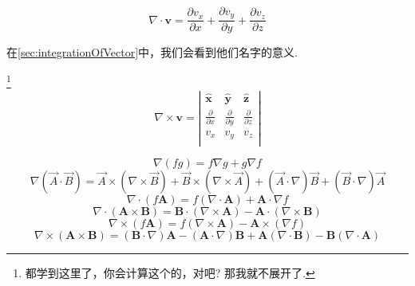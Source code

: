 \begin{theorem}[散度]
    \begin{equation}
        \nabla \cdot \mathbf{v}=\frac{\partial v_x}{\partial x}+\frac{\partial v_y}{\partial y}+\frac{\partial v_z}{\partial z}
    \end{equation}
\end{theorem}

在\cref{sec:integrationOfVector}中，我们会看到他们名字的意义.

\begin{theorem}[旋度]\footnote{都学到这里了，你会计算这个的，对吧? 那我就不展开了.}
    \begin{equation}
        \nabla \times \mathbf{v}=\left| \begin{matrix}
            \hat{\mathbf{x}}&		\hat{\mathbf{y}}&		\hat{\mathbf{z}}\\
            \frac{\partial}{\partial x}&		\frac{\partial}{\partial y}&		\frac{\partial}{\partial z}\\
            v_x&		v_y&		v_z\\
        \end{matrix} \right|
    \end{equation}
\end{theorem}

\begin{theorem}[微分的积规则]
    \begin{equation}
        \nabla(fg) = f\nabla g+g\nabla f \label{eq:diff_rule1}
    \end{equation}
    \begin{equation}
        \nabla(\vec A \cdot \vec B) = \vec A \times (\nabla \times \vec B) + \vec B \times (\nabla \times \vec A) + (\vec A \cdot \nabla)\vec B+ (\vec B \cdot \nabla)\vec A \label{eq:diff_rule2}
    \end{equation}
    \begin{equation}
        \nabla \cdot \left( f\mathbf{A} \right) =f\left( \nabla \cdot \mathbf{A} \right) +\mathbf{A}\cdot \nabla f\label{eq:diff_rule3}
    \end{equation}
    \begin{equation}
        \nabla \cdot \left( \mathbf{A}\times \mathbf{B} \right) =\mathbf{B}\cdot \left( \nabla \times \mathbf{A} \right) -\mathbf{A}\cdot \left( \nabla \times \mathbf{B} \right) \label{eq:diff_rule4}
    \end{equation}
    \begin{equation}
        \nabla \times \left( f\mathbf{A} \right) =f\left( \nabla \times \mathbf{A} \right) -\mathbf{A}\times \left( \nabla f \right) \label{eq:diff_rule5}
    \end{equation}
    \begin{equation}
        \nabla \times \left( \mathbf{A}\times \mathbf{B} \right) =\left( \mathbf{B}\cdot \nabla \right) \mathbf{A}-\left( \mathbf{A}\cdot \nabla \right) \mathbf{B}+\mathbf{A}\left( \nabla \cdot \mathbf{B} \right) -\mathbf{B}\left( \nabla \cdot \mathbf{A} \right) \label{eq:diff_rule6}
    \end{equation}
\end{theorem}

